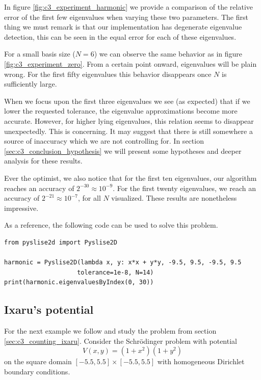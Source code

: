 In figure \ref{fig:c3_experiment_harmonic} we provide a comparison of the relative error of the first few eigenvalues when varying these two parameters. The first thing we must remark is that our implementation has degenerate eigenvalue detection, this can be seen in the equal error for each of these eigenvalues.

For a small basis size ($N = 6$) we can observe the same behavior as in figure \ref{fig:c3_experiment_zero}. From a certain point onward, eigenvalues will be plain wrong. For the first fifty eigenvalues this behavior disappears once $N$ is sufficiently large.

When we focus upon the first three eigenvalues we see (as expected) that if we lower the requested tolerance, the eigenvalue approximations become more accurate. However, for higher lying eigenvalues, this relation seems to disappear unexpectedly. This is concerning. It may suggest that there is still somewhere a source of inaccuracy which we are not controlling for. In section \ref{sec:c3_conclusion_hypothesis} we will present some hypotheses and deeper analysis for these results.

Ever the optimist, we also notice that for the first ten eigenvalues, our algorithm reaches an accuracy of $2^{-30} \approx 10^{-9}$. For the first twenty eigenvalues, we reach an accuracy of $2^{-21} \approx 10^{-7}$, for all $N$ visualized. These results are nonetheless impressive.

As a reference, the following code can be used to solve this problem.
\begin{verbatim}
from pyslise2d import Pyslise2D

harmonic = Pyslise2D(lambda x, y: x*x + y*y, -9.5, 9.5, -9.5, 9.5
                    tolerance=1e-8, N=14)
print(harmonic.eigenvaluesByIndex(0, 30))
\end{verbatim}


\subsection{Ixaru's potential}\label{sec:c3_experiment_ixaru}

For the next example we follow \cite{ixaru_new_2010} and study the problem from section \ref{sec:c3_counting_ixaru}. Consider the Schrödinger problem with potential
$$
  V(x, y) = (1+x^2)(1+y^2)
$$
on the square domain $[-5.5, 5.5] \times [-5.5, 5.5]$ with homogeneous Dirichlet boundary conditions.

